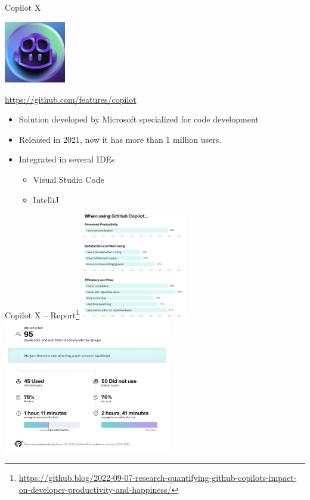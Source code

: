 \documentclass[presentation, 10pt]{beamer}\mode<presentation>{\usetheme{AMSBolognaFC}}
\begin{document}
\begin{frame}{Copilot X}
\begin{center}
\includegraphics[width=0.2\textwidth]{img/copilot-logo.png}

\url{https://github.com/features/copilot}
\end{center}

\begin{itemize}
	\item Solution developed by Microsoft specialized for code development
	\item Released in 2021, now it has more than 1 million users.
	\item Integrated in several IDEs
	\begin{itemize}
		\item Visual Studio Code
		\item IntelliJ
	\end{itemize}
\end{itemize}
\end{frame}
\begin{frame}{Copilot X -- Report\footnote{\url{https://github.blog/2022-09-07-research-quantifying-github-copilots-impact-on-developer-productivity-and-happiness/}}}
\includegraphics[width=0.35\textwidth]{img/copilot-report-1.png}
\includegraphics[width=0.55\textwidth]{img/copilot-report-2.png}
\end{frame}
\end{document}

